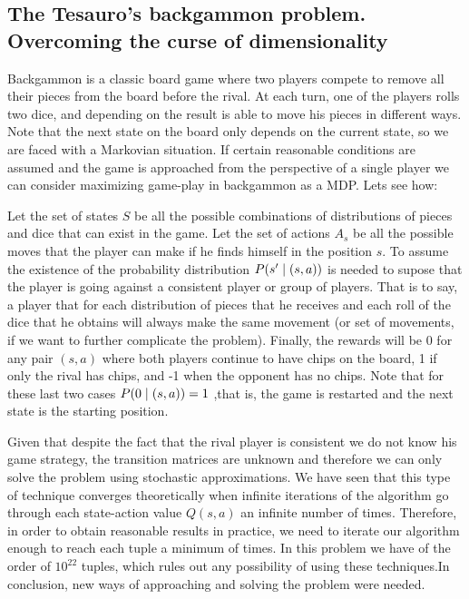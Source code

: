 \documentclass[12pt]{article}
\numberwithin{equation}{section}
\begin{document}
\subsection{The Tesauro's backgammon problem. Overcoming the curse of dimensionality}


Backgammon is a classic board game where two players compete to remove all their pieces from the board before the rival. At each  turn, one of the players rolls two dice, and depending on the result is able to move his pieces in different ways. Note that the next state on the board only depends on the current state, so we are faced with a Markovian situation. If certain reasonable conditions are assumed and  the game is approached from the perspective of a single player we can consider maximizing game-play in backgammon as a MDP. Lets see how:


Let the set of states  $S$ be all the possible combinations of distributions of pieces and dice that can exist in the game. Let the set of actions $A_s$ be all the possible moves that the player can make if he finds himself in the position $s$. To assume the existence of the probability distribution $P(s' \hspace{1mm}| \hspace{1mm} (s,a))$ is needed to supose that the player is going against a consistent player or group of players. That is to say, a player that for each distribution of pieces that he receives and each roll of the dice that he obtains will always make the same movement (or set of movements, if we want to further complicate the problem). Finally, the rewards will be 0 for any pair $(s,a)$ where both players continue to have chips on the board, 1 if only the rival has chips, and -1 when the opponent has no chips. Note that for these last two cases $P(0 \hspace{1mm}| \hspace{1mm} (s,a))=1$ ,that is, the game is restarted and the next state is the starting position.



Given that  despite the fact that the rival player is consistent we do not know his game strategy, the transition matrices are unknown and therefore we can only solve the problem using stochastic approximations. We have seen that this type of technique converges theoretically when infinite iterations of the algorithm go through each state-action value $Q(s,a)$ an infinite number of times. Therefore, in order to obtain reasonable results in practice, we need to iterate our algorithm enough  to reach each tuple a minimum of times. In this problem we have of the order of $10^{22}$ tuples, which rules out any possibility of using these techniques.In conclusion, new ways of approaching and solving the problem were needed.
\end{document}
